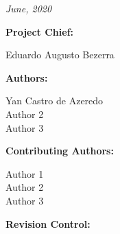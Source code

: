 %
%
%
%
%

%
%
%
%
%
%
%
\thispagestyle{empty}

\begin{center}

\textbf{\thetitle}

\textit{June, 2020}

\vspace{1cm}

\textbf{Project Chief:}

Eduardo Augusto Bezerra

\vspace{1cm}

\textbf{Authors:}

Yan Castro de Azeredo \\
Author 2 \\
Author 3 \\

\vspace{1cm}

\textbf{Contributing Authors:}

Author 1 \\
Author 2 \\
Author 3 \\

\vspace{1cm}


\textbf{Revision Control:}

\end{center}

